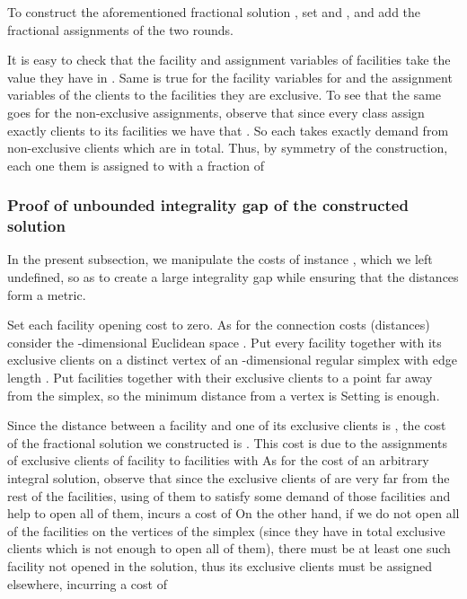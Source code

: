 \documentclass[11pt]{article}
\begin{document}
\noindent
To  construct  the   aforementioned  fractional  solution ,  set      and     , and  add the  fractional assignments of  the two
rounds. 

It is easy to check that the facility and assignment variables of facilities 
take the value they have in . Same is true for the facility variables for 
and the assignment variables of the clients to the facilities they are exclusive. 
To see that the same goes for the non-exclusive assignments, observe that since
every class assign exactly  clients to its facilities we have that .
So each  takes exactly  demand from non-exclusive clients which  are
 in total. Thus, by symmetry of the construction, each one them is assigned to 
with a fraction of 



\subsubsection{Proof of unbounded integrality gap of the constructed solution}

In the  present subsection, we  manipulate the costs of  instance ,
which we left undefined, so as to create a large integrality gap while
ensuring that the distances form a metric.

Set each facility opening cost to zero. As for the connection costs (distances)
consider the -dimensional Euclidean space . Put
every facility    together with its  exclusive clients on a
distinct vertex of an -dimensional regular simplex with edge length
. Put facilities  together with their exclusive clients to a point
far away  from the simplex, so  the minimum distance from  a vertex is
 Setting  is enough.

Since the distance between a facility and one of its exclusive clients
is  ,  the  cost  of  the fractional  solution  we  constructed  is
. This cost  is due to the assignments  of exclusive clients of
facility   to facilities  with   
As  for the cost  of an arbitrary integral  solution, observe
that since the  exclusive  clients of  are very far from
the  rest of  the facilities,  using   of them  to  satisfy some
demand of  those facilities and help  to open all of  them, incurs a
cost of  On the other hand, if we do not open all of the 
facilities on  the vertices of the  simplex (since they  have in total
  exclusive clients  which is  not enough  to open  all of
them), there  must be  at least  one such facility  not opened  in the
solution, thus its  exclusive clients must be assigned elsewhere,
incurring a cost of  
\end{document}
